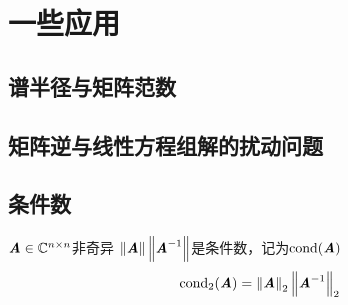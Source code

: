 \section{一些应用}
\label{sec:一些应用}

\subsection{谱半径与矩阵范数}
\label{sub:谱半径与矩阵范数}

\subsection{矩阵逆与线性方程组解的扰动问题}
\label{sub:矩阵逆与线性方程组解的扰动问题}

\subsection{条件数}
\label{sub:条件数}

\begin{definition}[条件数]
    $\MA \in \SetC^{n \times n}$非奇异
    $\norm{\MA}\norm{\MA^{-1}}$是条件数，记为$\mathrm{cond}(\MA)$
    $$
    \mathrm{cond}_2(\MA) = \norm{\MA}_2\norm{\MA^{-1}}_2
    $$
\end{definition}

